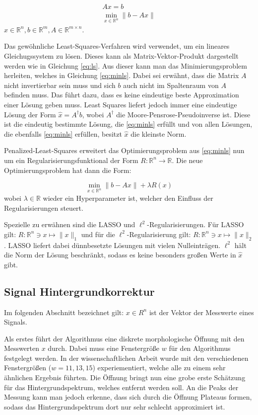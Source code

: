\documentclass{article}
\newcommand{\R}[0]{\mathbb{R}}
\begin{document}
\begin{align}
    Ax = b \label{eq:ls} \\ 
    \min\limits_{x \in \R^n} \lVert b - Ax \rVert \label{eq:minls}
\end{align}
$x \in \R^n, b \in \R^m, A \in \R^{m\times n}$.

Das gewöhnliche Least-Squares-Verfahren wird verwendet, um ein lineares Gleichugssystem zu lösen. 
Dieses kann als Matrix-Vektor-Produkt dargestellt werden wie in Gleichung \ref{eq:ls}. 
Aus dieser kann man das Minimierungsproblem herleiten, welches in Gleichung \ref{eq:minls}.
Dabei sei erwähnt, dass die Matrix $A$ nicht invertierbar sein muss und sich $b$ auch nicht im Spaltenraum von $A$ befinden muss.
Das führt dazu, dass es keine eindeutige beste Approximation einer Lösung geben muss.
Least Squares liefert jedoch immer eine eindeutige Lösung der Form $\hat{x} = A^{\dagger} b$, wobei $A^{\dagger}$ die Moore-Pensrose-Pseudoinverse ist.
Diese ist die eindeutig bestimmte Lösung, die \ref{eq:minls} erfüllt und von allen Lösungen, die ebenfalls \ref{eq:minls} erfüllen, besitzt $\hat{x}$ die kleinste Norm.

Penalized-Least-Squares erweitert das Optimierungsproblem aus \ref{eq:minls} nun um ein Regularisierungsfunktional der Form $R: \R^n \to \R$.
Die neue Optimierungsproblem hat dann die Form:

\begin{equation}
    \min\limits_{x \in \R^n} \lVert b - Ax \rVert + \lambda R(x)
\end{equation}
wobei $\lambda \in \R$ wieder ein Hyperparameter ist, welcher den Einfluss der Regularisierungen steuert.

Spezielle zu erwähnen sind die LASSO und $\ell^2$-Regularisierungen. Für LASSO gilt: $R: \R^n \ni x \mapsto \lVert x \rVert_1$ und für die $\ell^2$-Regularisierung gilt: $R: \R^n \ni x \mapsto \lVert x \rVert_2$.
LASSO liefert dabei dünnbesetzte Lösungen mit vielen Nulleinträgen. 
$\ell^2$ hält die Norm der Lösung beschränkt, sodass es keine besonders großen Werte in $\hat{x}$ gibt.

\subsection{Signal Hintergrundkorrektur}

Im folgenden Abschnitt bezeichnet gilt: $x \in R^n$ ist der Vektor der Messwerte eines Signals. 

Als erstes führt der Algorithmus eine diskrete morphologische Öffnung mit den Messwerten $x$ durch. Dabei muss eine Fenstergröße $w$ für den Algorithmus festgelegt werden.
In der wissenschaftlichen Arbeit wurde mit den verschiedenen Fenstergrößen ($w=11,13,15$) experiementiert, welche alle zu einem sehr ähnlichen Ergebnis führten.
Die Öffnung bringt nun eine grobe erste Schätzung für das Hintergrundspektrum, welches entfernt werden soll.
An die Peaks der Messung kann man jedoch erkenne, dass sich durch die Öffnung Plateaus formen, sodass das Hintergrundspektrum dort nur sehr schlecht approximiert ist.
\end{document}
